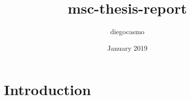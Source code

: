 \documentclass{article}
\title{msc-thesis-report}
\author{diegocasmo }
\date{January 2019}
\begin{document}
\maketitle

\section{Introduction}
\end{document}
